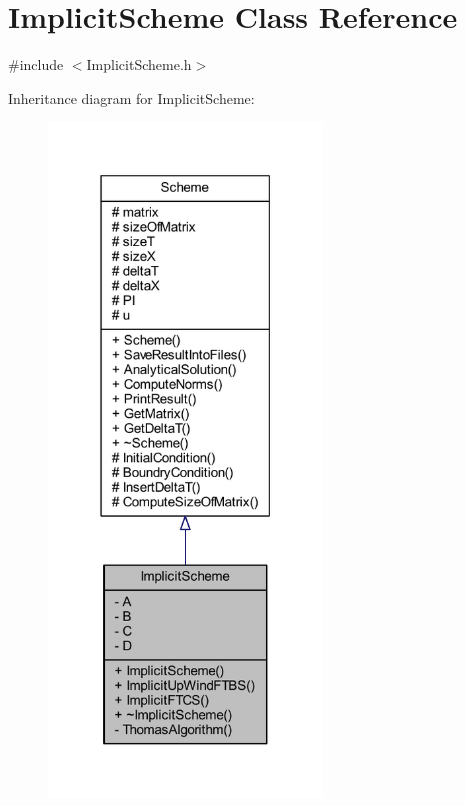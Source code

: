 \hypertarget{class_implicit_scheme}{}\section{Implicit\+Scheme Class Reference}
\label{class_implicit_scheme}


{\ttfamily \#include $<$Implicit\+Scheme.\+h$>$}



Inheritance diagram for Implicit\+Scheme\+:\nopagebreak
\begin{figure}[H]
\begin{center}
\leavevmode
\includegraphics[width=206pt]{class_implicit_scheme__inherit__graph}
\end{center}
\end{figure}


